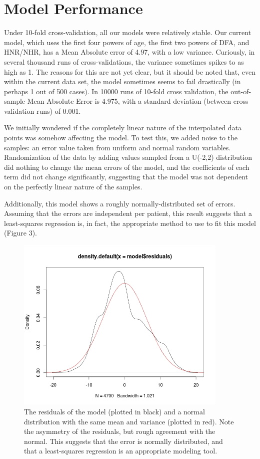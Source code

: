 \documentclass{report}
\begin{document}
\section*{Model Performance}

Under 10-fold cross-validation, all our models were relatively stable. Our current model, which uses the first four powers of age, the first two powers of DFA, and HNR/NHR, has a
Mean Absolute error of 4.97, with a low variance. Curiously, in several thousand runs of cross-validations, the variance sometimes spikes to as high as 1. The reasons for this are
not yet clear, but it should be noted that, even within the current data set, the model sometimes seems to fail drastically (in perhaps 1 out of 500 cases). In 10000 runs of
10-fold cross validation, the out-of-sample Mean Absolute Error is 4.975, with a standard deviation (between cross validation runs) of 0.001.

We initially wondered if the completely linear nature of the interpolated data points was somehow affecting the model. To test this, we added noise to the samples: an error value taken from uniform and normal random variables.
Randomization of the data by adding values sampled from a U(-2,2) distribution did nothing to change the mean errors of the model, and the coefficients of each term did not change significantly, suggesting that the model was not dependent
on the perfectly linear nature of the samples.

Additionally, this model shows a roughly normally-distributed set of errors. Assuming that the errors are independent per patient, this result suggests that a least-squares regression is, in fact,
the appropriate method to use to fit this model (Figure 3).

\begin{figure}

\centering
\includegraphics[width = 0.9\textwidth]{Error_Densities}

\caption{The residuals of the model (plotted in black) and a normal distribution with the same mean and variance (plotted in red). Note the asymmetry of the residuals, but rough agreement with the normal.
This suggests that the error is normally distributed, and that a least-squares regression is an appropriate modeling tool.}

\end{figure}
\end{document}
